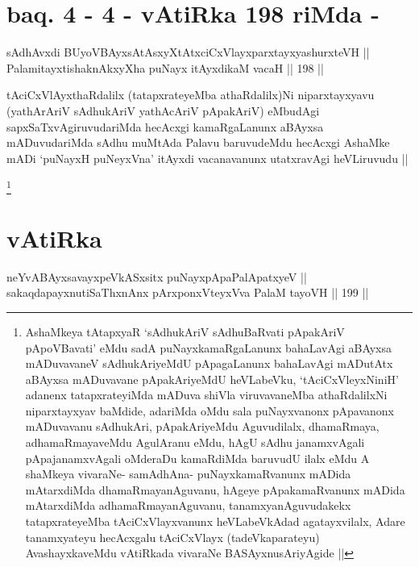 \section*{baq. 4 - 4 - vAtiRka 198 riMda -}


\begin{shl}
sAdhAvxdi BUyoVBAyxsAtAsxyXtAtxciCxVlayxparxtayxyashurxteVH || \\
PalamitayxtishaknAkxyX\s \s ha puNayx itAyxdikaM vacaH ||  198 ||  
\end{shl}

\begin{artha}
tAciCxVlAyxthaRdalilx (tatapxrateyeMba athaRdalilx)Ni niparxtayxyavu
(yathArAriV sAdhukAriV yathAcAriV pApakAriV) eMbudAgi
sapxSaTxvAgiruvudariMda hecAcxgi kamaRgaLanunx aBAyxsa mADuvudariMda
sAdhu muMtAda Palavu baruvudeMdu hecAcxgi AshaMke mADi `puNayxH
puNeyxVna' itAyxdi vacanavanunx utatxravAgi heVLiruvudu ||
\end{artha}


\footnote{AshaMkeya tAtapxyaR `sAdhukAriV sAdhuBaRvati pApakAriV
  pApoVBavati' eMdu sadA puNayxkamaRgaLanunx bahaLavAgi aBAyxsa
  mADuvavaneV sAdhukAriyeMdU pApagaLanunx bahaLavAgi mADutAtx aBAyxsa
  mADuvavane pApakAriyeMdU heVLabeVku, `tAciCxVleyxNiniH' adanenx
  tatapxrateyiMda mADuva shiVla viruvavaneMba athaRdalilxNi
  niparxtayxyav baMdide, adariMda oMdu sala puNayxvanonx pApavanonx
  mADuvavanu sAdhukAri, pApakAriyeMdu Aguvudilalx, dhamaRmaya,
  adhamaRmayaveMdu AgulAranu eMdu, hAgU sAdhu janamxvAgali
  pApajanamxvAgali oMderaDu kamaRdiMda baruvudU ilalx eMdu A shaMkeya
  vivaraNe- samAdhAna- puNayxkamaRvanunx mADida mAtarxdiMda
  dhamaRmayanAguvanu, hAgeye pApakamaRvanunx mADida mAtarxdiMda
  adhamaRmayanAguvanu, tanamxyanAguvudakekx tatapxrateyeMba
  tAciCxVlayxvanunx heVLabeVkAdad agatayxvilalx, Adare tanamxyateyu
  hecAcxgalu tAciCxVlayx (tadeVkaparateyu) AvashayxkaveMdu vAtiRkada
  vivaraNe BASAyxnusAriyAgide ||}\stext

\section*{vAtiRka}

\begin{shl}
neYvABAyxsavayxpeVkASx\s sitx puNayxpApaPalApatxyeV || \\
sakaqdapayxnutiSaThxnAnx pArxponxVteyxVva PalaM tayoVH ||  199 || 
\end{shl}


